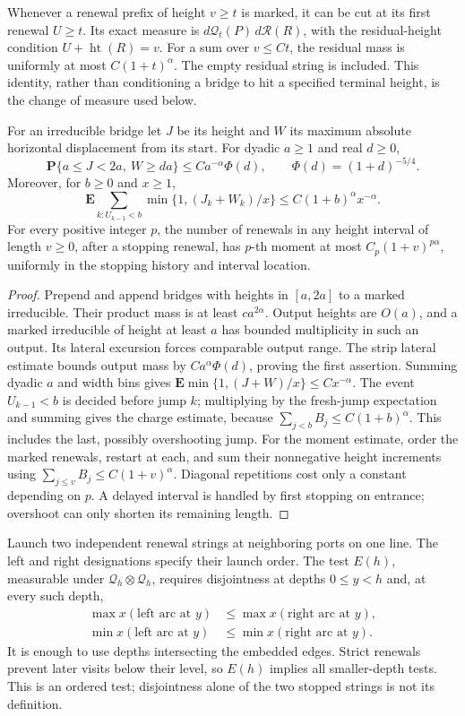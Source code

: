 Whenever a renewal prefix of height \(v\ge t\) is marked, it can be cut
at its first renewal \(U\ge t\). Its exact measure is
\(d\mathcal Q_t(P)\,d\mathcal R(R)\), with the residual-height condition
\(U+\operatorname{ht}(R)=v\). For a sum over \(v\le Ct\), the residual
mass is uniformly at most \(C(1+t)^\alpha\). The empty residual string
is included. This identity, rather than conditioning a bridge to hit a
specified terminal height, is the change of measure used below.

\begin{lemma}
\label{lem:10-charges}
For an irreducible bridge let \(J\) be its height and \(W\) its maximum
absolute horizontal displacement from its start. For dyadic \(a\ge1\) and real $d\ge0$,
\[
 \mathbf P\{a\le J<2a,\ W\ge da\}
 \le Ca^{-\alpha}\Phi(d),\qquad \Phi(d)=(1+d)^{-5/4}.
\]
Moreover, for $b\ge0$ and \(x\ge1\),
\[
 \mathbf E\sum_{k:U_{k-1}<b}
 \min\{1,(J_k+W_k)/x\}
 \le C(1+b)^\alpha x^{-\alpha}.
\]
For every positive integer $p$, the number of renewals in any height interval of length \(v\ge0\), after a stopping
renewal, has \(p\)-th moment at most
\(C_p(1+v)^{p\alpha}\), uniformly in the stopping history and interval
location.
\end{lemma}

\begin{proof}
Prepend and append bridges with heights in \([a,2a]\) to a marked
irreducible. Their product mass is at least \(ca^{2\alpha}\). Output
heights are \(O(a)\), and a marked irreducible of height at least \(a\)
has bounded multiplicity in such an output. Its lateral excursion forces
comparable output range. The strip lateral estimate bounds output mass
by \(Ca^\alpha\Phi(d)\), proving the first assertion. Summing dyadic
\(a\) and width bins gives
\(\mathbf E\min\{1,(J+W)/x\}\le Cx^{-\alpha}\).
The event \(U_{k-1}<b\) is decided before jump \(k\); multiplying by the
fresh-jump expectation and summing gives the charge estimate, because
\(\sum_{j<b}B_j\le C(1+b)^\alpha\). This includes the last, possibly
overshooting jump. For the moment estimate, order the marked renewals,
restart at each, and sum their nonnegative height increments using
\(\sum_{j\le v}B_j\le C(1+v)^\alpha\). Diagonal repetitions cost only
a constant depending on \(p\). A delayed interval is handled by first
stopping on entrance; overshoot can only shorten its remaining length.
\end{proof}

Launch two independent renewal strings at neighboring ports on one line.
The left and right designations specify their launch order. The test
\(E(h)\), measurable under \(\mathcal Q_h\otimes\mathcal Q_h\), requires
disjointness at depths \(0\le y<h\) and, at every such depth,
\[
 \begin{aligned}
 \max x(\text{left arc at }y)&\le\max x(\text{right arc at }y),\\
 \min x(\text{left arc at }y)&\le\min x(\text{right arc at }y).
 \end{aligned}
\]
It is enough to use depths intersecting the embedded edges. Strict
renewals prevent later visits below their level, so \(E(h)\) implies
all smaller-depth tests. This is an ordered test; disjointness alone of
the two stopped strings is not its definition.

